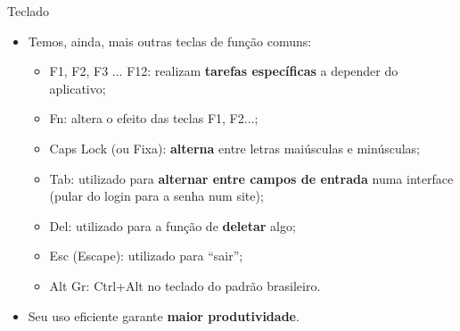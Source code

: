 \begin{frame}{Teclado}
	\begin{block}{}
		\begin{itemize}
			\item Temos, ainda, mais outras teclas de função comuns:
			      \begin{itemize}
				      \item\normalsize F1, F2, F3 ... F12: realizam \textbf{tarefas específicas} a depender do aplicativo;

				            \smallskip

				      \item\normalsize Fn: altera o efeito das teclas F1, F2...;

				            \smallskip

				      \item\normalsize Caps Lock (ou Fixa): \textbf{alterna} entre letras maiúsculas e minúsculas;

				            \smallskip

				      \item\normalsize Tab: utilizado para \textbf{alternar entre campos de entrada} numa interface (pular do login para a senha num site);

				            \smallskip

				      \item\normalsize Del: utilizado para a função de \textbf{deletar} algo;

				            \smallskip

				      \item\normalsize Esc (Escape): utilizado para ``sair'';

				            \smallskip

				      \item\normalsize Alt Gr: Ctrl+Alt no teclado do padrão brasileiro.
			      \end{itemize}
			\item Seu uso eficiente garante \textbf{maior produtividade}.
		\end{itemize}
	\end{block}
\end{frame}


